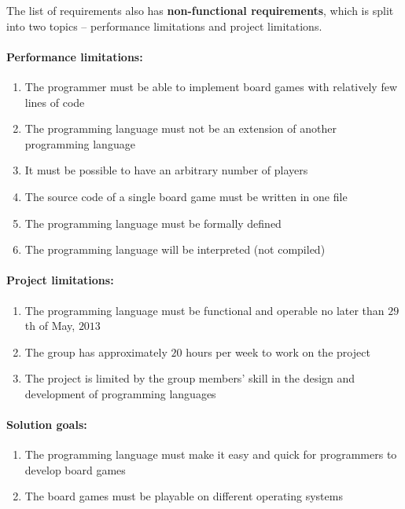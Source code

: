The list of requirements also has \textbf{non-functional requirements}, which is
split into two topics -- performance limitations and project limitations.

\paragraph*{Performance limitations:}
\begin{enumerate}
  \item The programmer must be able to implement board games with relatively few
    lines of code
  \item The programming language must not be an extension of another programming
    language
  \item It must be possible to have an arbitrary number of players
  \item The source code of a single board game must be written in one file
  \item The programming language must be formally defined
  \item The programming language will be interpreted (not compiled)
\end{enumerate}

\paragraph*{Project limitations:}
\begin{enumerate}
  \item The programming language must be functional and operable no later than
    $29$th of May, $2013$
  \item The group has approximately $20$ hours per week to work on the project
  \item The project is limited by the group members' skill in the design and
    development of programming languages
\end{enumerate}

\paragraph*{Solution goals:}
\begin{enumerate}
  \item The programming language must make it easy and quick for programmers to
    develop board games
  \item The board games must be playable on different operating systems
\end{enumerate}



